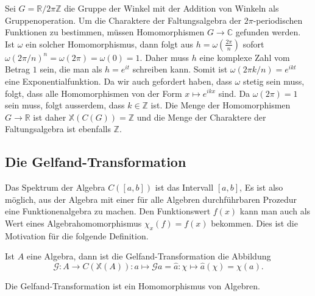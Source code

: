 \begin{beispiel}
\label{buch:gruppen:gelfand:bsp:winkel}
Sei $G= \mathbb{R}/2\pi\mathbb{Z}$ die Gruppe der Winkel mit der 
Addition von Winkeln als Gruppenoperation.
Um die Charaktere der Faltungsalgebra der $2\pi$-periodischen Funktionen
zu bestimmen, müssen Homomorphismen $G\to\mathbb{C}$ gefunden werden.
Ist $\omega$ ein solcher Homomorphismus, dann folgt aus
$h=\omega(\frac{2\pi}{n})$ sofort
$\omega(2\pi/n)^n = \omega(2\pi)=\omega(0)=1$.
Daher muss $h$ eine komplexe Zahl vom Betrag $1$ sein, die man als
$h=e^{it}$ schreiben kann.
Somit ist $\omega(2\pi k/n) = e^{ikt}$ eine Exponentialfunktion.
Da wir auch gefordert haben, dass $\omega$ stetig sein muss, folgt,
dass alle Homomorphismen von der Form $x\mapsto e^{ikx}$ sind.
Da $\omega(2\pi)=1$ sein muss, folgt ausserdem, dass $k\in \mathbb{Z}$
ist.
Die Menge der Homomorphismen $G\to\mathbb{R}$ ist daher
$\mathbb{X}(C(G)) = \mathbb{Z}$ und
die Menge der Charaktere der Faltungsalgebra ist ebenfalls $\mathbb{Z}$.
\end{beispiel}


%
%
\subsection{Die Gelfand-Transformation}
Das Spektrum der Algebra $C([a,b])$ ist das Intervall $[a,b]$,
Es ist also möglich, aus der Algebra mit einer für alle Algebren
durchführbaren Prozedur eine Funktionenalgebra zu machen.
Den Funktionswert $f(x)$  kann man auch als Wert eines 
Algebrahomomorphismus $\chi_x(f) = f(x)$ bekommen.
Dies ist die Motivation für die folgende Definition.

\begin{definition}
Ist $A$ eine Algebra, dann ist die Gelfand-Transformation
die Abbildung
\[
\mathscr{G}
\colon
A \to C(\mathbb{X}(A))
:
a
\mapsto \mathscr{G}a = \hat{a}
\colon \chi \mapsto \hat{a}(\chi) = \chi(a).
\]
\end{definition}

\begin{satz}
Die Gelfand-Transformation ist ein Homomorphismus von Algebren.
\end{satz}

